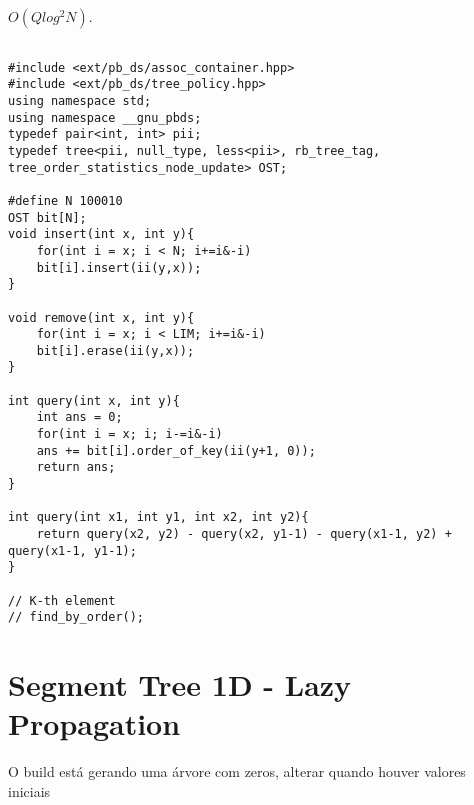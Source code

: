 $O(Qlog^2N)$.


\begin{multicols}{2}
	\begin{lstlisting}

#include <ext/pb_ds/assoc_container.hpp>
#include <ext/pb_ds/tree_policy.hpp>
using namespace std;
using namespace __gnu_pbds;
typedef pair<int, int> pii;
typedef tree<pii, null_type, less<pii>, rb_tree_tag, tree_order_statistics_node_update> OST;

#define N 100010
OST bit[N];
void insert(int x, int y){
	for(int i = x; i < N; i+=i&-i)
	bit[i].insert(ii(y,x));
}

void remove(int x, int y){
	for(int i = x; i < LIM; i+=i&-i)
	bit[i].erase(ii(y,x));
}

int query(int x, int y){
	int ans = 0;
	for(int i = x; i; i-=i&-i)
	ans += bit[i].order_of_key(ii(y+1, 0));
	return ans;
}

int query(int x1, int y1, int x2, int y2){
	return query(x2, y2) - query(x2, y1-1) - query(x1-1, y2) + query(x1-1, y1-1);
}

// K-th element
// find_by_order();

\end{lstlisting}
\end{multicols}

\section{Segment Tree 1D - Lazy Propagation}

O build está gerando uma árvore com zeros, alterar quando houver valores iniciais

